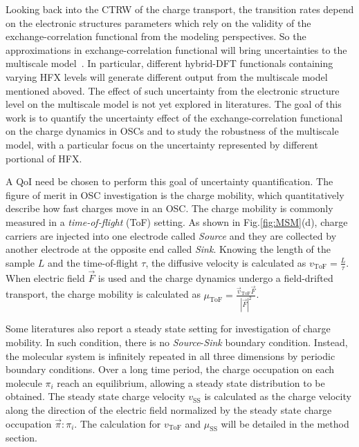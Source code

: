 \documentclass[%
 reprint,
 amsmath,amssymb,
 aps,
]{revtex4-2}
\begin{document}
Looking back into the CTRW of the charge transport, the transition rates depend on the electronic structures parameters which rely on the validity of the exchange-correlation functional from the modeling perspectives.
So the approximations in exchange-correlation functional will bring uncertainties to the multiscale model~\cite{medvedev_density_2017}. 
In particular, different hybrid-DFT functionals containing varying HFX levels will generate different output from the multiscale model mentioned aboved. 
The effect of such uncertainty from the electronic structure level on the multiscale model is not yet explored in literatures. 
The goal of this work is to quantify the uncertainty effect of the exchange-correlation functional on the charge dynamics in OSCs and to study the robustness of the multiscale model, with a particular focus on the uncertainty represented by different portional of HFX.

A QoI need be chosen to perform this goal of uncertainty quantification. 
The figure of merit in OSC investigation is the charge mobility, which quantitatively describe how fast charges move in an OSC. 
The charge mobility is commonly measured in a \textit{time-of-flight} (ToF) setting. 
As shown in Fig.\ref{fig:MSM}(d), charge carriers are injected into one electrode called \textit{Source} and they are collected by another electrode at the opposite end called \textit{Sink}. 
Knowing the length of the sample $L$ and the time-of-flight $\tau$, the diffusive velocity is calculated as $v_\text{ToF}=\frac{L}{\tau}$.
When electric field $\vec{F}$ is used and the charge dynamics undergo a field-drifted transport, the charge mobility is calculated as $\mu_\text{ToF}=\frac{\vec{v}_\text{ToF} \vec{F}}{|\vec{F}|^2}$. 

Some literatures also report a steady state setting for investigation of charge mobility. In such condition, there is no \textit{Source}-\textit{Sink} boundary condition. Instead, the molecular system is infinitely repeated in all three dimensions by periodic boundary conditions. 
Over a long time period, the charge occupation on each molecule $\pi_i$ reach an equilibrium, allowing a steady state distribution to be obtained.
The steady state charge velocity $v_\text{SS}$ is calculated as the charge velocity along the direction of the electric field normalized by the steady state charge occupation $\vec{\pi}:\pi_i$. 
The calculation for $v_\text{ToF}$ and $\mu_\text{SS}$ will be detailed in the method section.
\end{document}
